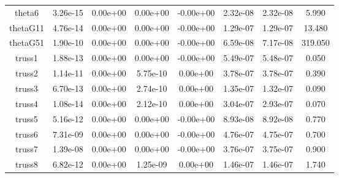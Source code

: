 {{\begin{table}[h]
\begin{center}
{\begin{tabular}{cccccccc}
              theta6 & 3.26e-15 & 0.00e+00 & 0.00e+00 & -0.00e+00 & 2.32e-08 & 2.32e-08 & 5.990 \\ 
            thetaG11 & 4.76e-14 & 0.00e+00 & 0.00e+00 & -0.00e+00 & 1.29e-07 & 1.29e-07 & 13.480 \\ 
            thetaG51 & 1.90e-10 & 0.00e+00 & 0.00e+00 & -0.00e+00 & 6.59e-08 & 7.17e-08 & 319.050 \\ 
              truss1 & 1.88e-13 & 0.00e+00 & 0.00e+00 & -0.00e+00 & 5.49e-07 & 5.48e-07 & 0.050 \\ 
              truss2 & 1.14e-11 & 0.00e+00 & 5.75e-10 & 0.00e+00 & 3.78e-07 & 3.78e-07 & 0.390 \\ 
              truss3 & 6.70e-13 & 0.00e+00 & 2.74e-10 & 0.00e+00 & 1.35e-07 & 1.32e-07 & 0.090 \\ 
              truss4 & 1.08e-14 & 0.00e+00 & 2.12e-10 & 0.00e+00 & 3.04e-07 & 2.93e-07 & 0.070 \\ 
              truss5 & 5.16e-12 & 0.00e+00 & 0.00e+00 & -0.00e+00 & 8.93e-08 & 8.92e-08 & 0.770 \\ 
              truss6 & 7.31e-09 & 0.00e+00 & 0.00e+00 & -0.00e+00 & 4.76e-07 & 4.75e-07 & 0.700 \\ 
              truss7 & 1.39e-08 & 0.00e+00 & 0.00e+00 & -0.00e+00 & 3.76e-07 & 3.75e-07 & 0.900 \\ 
              truss8 & 6.82e-12 & 0.00e+00 & 1.25e-09 & 0.00e+00 & 1.46e-07 & 1.46e-07 & 1.740 \\ 
      \bottomrule
    \end{tabular}
  }  
\end{center}
\end{table}}}

